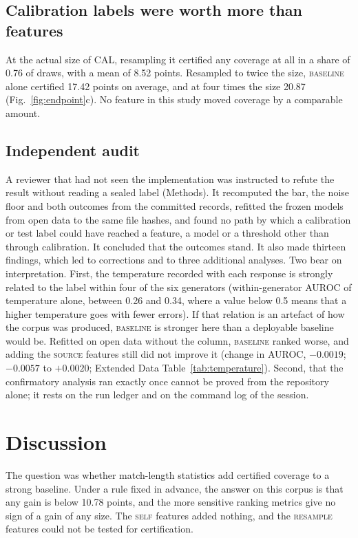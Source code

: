 \documentclass[11pt]{article}
\newcommand{\arm}[1]{\textsc{#1}}
\begin{document}
\subsection*{Calibration labels were worth more than features}

At the actual size of CAL, resampling it certified any coverage at all in a share of 0.76 of draws, with a mean of 8.52 points. Resampled to twice the size, \arm{baseline} alone certified 17.42 points on average, and at four times the size 20.87 (Fig.~\ref{fig:endpoint}c). No feature in this study moved coverage by a comparable amount.

\subsection*{Independent audit}

A reviewer that had not seen the implementation was instructed to refute the result without reading a sealed label (Methods). It recomputed the bar, the noise floor and both outcomes from the committed records, refitted the frozen models from open data to the same file hashes, and found no path by which a calibration or test label could have reached a feature, a model or a threshold other than through calibration. It concluded that the outcomes stand. It also made thirteen findings, which led to corrections and to three additional analyses. Two bear on interpretation. First, the temperature recorded with each response is strongly related to the label within four of the six generators (within-generator AUROC of temperature alone, between 0.26 and 0.34, where a value below 0.5 means that a higher temperature goes with fewer errors). If that relation is an artefact of how the corpus was produced, \arm{baseline} is stronger here than a deployable baseline would be. Refitted on open data without the column, \arm{baseline} ranked worse, and adding the \arm{source} features still did not improve it (change in AUROC, $-0.0019$; $-0.0057$ to $+0.0020$; Extended Data Table~\ref{tab:temperature}). Second, that the confirmatory analysis ran exactly once cannot be proved from the repository alone; it rests on the run ledger and on the command log of the session.

\section*{Discussion}

The question was whether match-length statistics add certified coverage to a strong baseline. Under a rule fixed in advance, the answer on this corpus is that any gain is below 10.78 points, and the more sensitive ranking metrics give no sign of a gain of any size. The \arm{self} features added nothing, and the \arm{resample} features could not be tested for certification.
\end{document}
